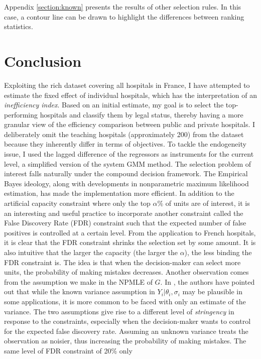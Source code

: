 \documentclass[12pt]{article}
\begin{document}
Appendix \ref{section:known} presents the results of other selection rules. In
this case, a contour line can be drawn to highlight the differences between
ranking statistics.

\section{Conclusion}
Exploiting the rich dataset covering all hospitals in France, I have attempted
to estimate the fixed effect of individual hospitals, which has the
interpretation of an \textit{inefficiency index}. Based on an initial estimate,
my goal is to select the top-performing hospitals and classify them by legal
status, thereby having a more granular view of the efficiency comparison
between public and private hospitals. I deliberately omit the teaching
hospitals (approximately 200) from the dataset because they inherently differ
in terms of objectives. To tackle the endogeneity issue, I used the lagged
difference of the regressors as instruments for the current level, a simplified
version of the system GMM method. The selection problem of interest falls
naturally under the compound decision framework. The Empirical Bayes ideology,
along with developments in nonparametric maximum likelihood estimation, has
made the implementation more efficient. In addition to the artificial capacity
constraint where only the top $\alpha\%$ of units are of interest, it is an
interesting and useful practice to incorporate another constraint called the
False Discovery Rate (FDR) constraint such that the expected number of false
positives is controlled at a certain level. From the application to French
hospitals, it is clear that the FDR constraint shrinks the selection set by
some amount. It is also intuitive that the larger the capacity (the larger the
$\alpha$), the less binding the FDR constraint is. The idea is that when the
decision-maker can select more units, the probability of making mistakes
decreases. Another observation comes from the assumption we make in the NPMLE
of $G$. In \citet{gu2023invidious}, the authors have pointed out that while the
known variance assumption in $Y_i|\theta_i,\sigma_i$ may be plausible in some
applications, it is more common to be faced with only an estimate of the
variance. The two assumptions give rise to a different level of
\textit{stringency} in response to the constraints, especially when the
decision-maker wants to control for the expected false discovery rate. Assuming
an unknown variance treats the observation as noisier, thus increasing the
probability of making mistakes. The same level of FDR constraint of 20\% only
\end{document}
